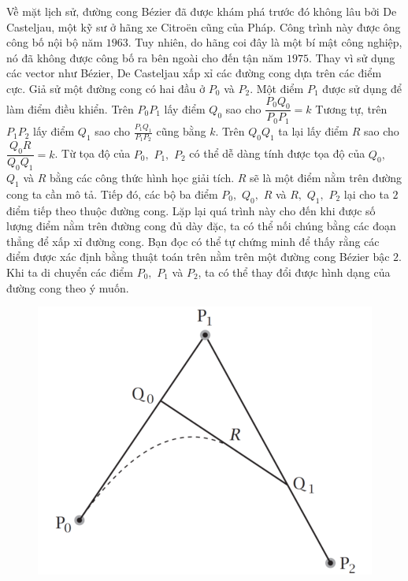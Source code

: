 \begin{multicols}{2}
\begin{figure}[H]
		\vspace*{-10pt}
	\end{figure}
	\vskip 0.1cm
	\vskip 0.1cm
	Về mặt lịch sử, đường cong Bézier đã được khám phá trước đó không lâu bởi De Casteljau, một kỹ sư ở hãng xe Citroën cũng của Pháp. Công trình này được ông công bố nội bộ năm $1963$. Tuy nhiên, do hãng coi đây là một bí mật công nghiệp, nó đã không được công bố ra bên ngoài cho đến tận năm $1975$.
	\vskip 0.1cm
	Thay vì sử dụng các vector như Bézier, De Casteljau xấp xỉ các đường cong dựa trên các điểm cực. Giả sử một đường cong có hai đầu ở $P_0$ và $P_2$. Một điểm $P_1$ được sử dụng để làm điểm điều khiển. Trên $P_0 P_1$ lấy điểm $Q_0$ sao cho $\dfrac{P_0Q_0}{P_0P_1} = k$ Tương tự, trên $P_1 P_2$ lấy điểm $Q_1$ sao cho $\frac{P_1 Q_1}{P_1 P_2}$ cũng bằng $k$. Trên $Q_0 Q_1$ ta lại lấy điểm $R$ sao cho $\dfrac{Q_0 R}{Q_0 Q_1} = k$. Từ tọa độ của $P_0,$ $P_1,$ $P_2$ có thể dễ dàng tính được tọa độ của $Q_0,$ $Q_1$ và $R$ bằng các công thức hình học giải tích. $R$ sẽ là một điểm nằm trên đường cong ta cần mô tả. Tiếp đó, các bộ ba điểm $P_0,$ $Q_0,$ $R$ và $R,$ $Q_1,$ $P_2$ lại cho ta $2$ điểm tiếp theo thuộc đường cong. Lặp lại quá trình này cho đến khi được số lượng điểm nằm trên đường cong đủ dày đặc, ta có thể nối chúng bằng các đoạn thẳng để xấp xỉ đường cong. Bạn đọc có thể tự chứng minh để thấy rằng các điểm được xác định bằng thuật toán trên nằm trên một đường cong Bézier bậc $2$. Khi ta di chuyển các điểm $P_0,$ $P_1$  và $P_2$, ta có thể thay đổi được hình dạng của đường cong theo ý muốn.
	\begin{figure}[H]
		\vspace*{-5pt}
		\centering
		\captionsetup{labelformat= empty, justification=centering}
		\includegraphics[width= 0.9\linewidth]{4}

\end{figure}
\end{multicols}
